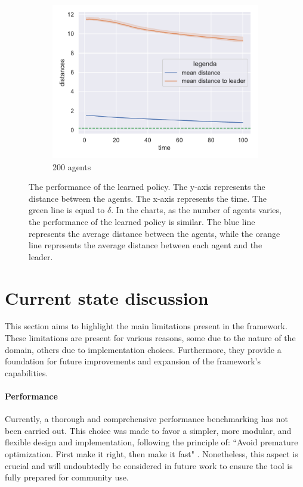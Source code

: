 \documentclass[12pt,a4paper,openright,twoside]{book}
\begin{document}
\begin{figure}[h!]
\begin{subfigure}[b]{0.32\textwidth}
        \includegraphics[width=\textwidth]{figures/data-ftl-200.pdf}
        \caption{200 agents}
    \end{subfigure}
\caption{The performance of the learned policy. 
The y-axis represents the distance between the agents.
The x-axis represents the time.
The green line is equal to $\delta$.
In the charts, as the number of agents varies, the performance of the learned policy is similar.
The blue line represents the average distance between the agents, while the orange line represents
the average distance between each agent and the leader.
}
\label{fig:test-ftl}
\end{figure}

\section{Current state discussion}
This section aims to highlight the main limitations present in the framework. These limitations are
 present for various reasons, some due to the nature of the domain, others due to implementation choices. 
 Furthermore, they provide a foundation for future improvements and expansion of the framework's capabilities.

\paragraph{Performance} 
Currently, a thorough and comprehensive performance benchmarking has not been carried out. This choice was made to 
    favor a simpler, more modular, and flexible design and implementation, following the principle of:
    ``Avoid premature optimization. First make it right, then make it fast" \cite{hyde2006fallacy}.
    Nonetheless, this aspect is crucial and will undoubtedly be considered in future work to ensure the tool is 
    fully prepared for community use.
\end{document}
